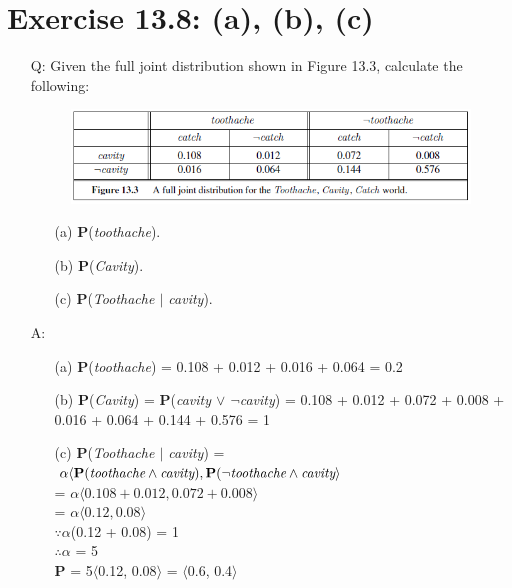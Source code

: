 \documentclass{article}
\begin{document}
\section{Exercise 13.8: (a), (b), (c)}
\begin{itemize}
\item[Q:]Given the full joint distribution shown in Figure 13.3, calculate the following:
\begin{figure}[h!]
\centering
\includegraphics[width=\textwidth]{fig13_3.png}
\end{figure}
\begin{itemize}
\item[(a)]\textbf P(\textit{toothache}).
\item[(b)]\textbf P(\textit{Cavity}).
\item[(c)]\textbf P(\textit{Toothache $\vert$ cavity}).
\end{itemize}
\item[A:]
\begin{itemize}
\item[(a)]\textbf P(\textit{toothache}) = 0.108 + 0.012 + 0.016 + 0.064 = 0.2
\item[(b)]\textbf P(\textit{Cavity}) = \textbf P(\textit{cavity $\vee$ $\neg$cavity}) = 0.108 + 0.012 + 0.072 + 0.008 + 0.016 + 0.064 + 0.144 + 0.576 = 1
\item[(c)]\textbf P(\textit{Toothache $\vert$ cavity}) = $\alpha\langle\textbf P(\textit{toothache}\wedge\textit{cavity}),\textbf P(\neg\textit{toothache}\wedge\textit{cavity}\rangle$\\= $\alpha\langle0.108 + 0.012, 0.072 + 0.008\rangle$\\ = $\alpha\langle0.12, 0.08\rangle$\\$\because\alpha$(0.12 + 0.08) = 1\\$\therefore\alpha$ = 5\\\textbf P = 5$\langle$0.12, 0.08$\rangle$ = $\langle$0.6, 0.4$\rangle$
\end{itemize}
\end{itemize}
\end{document}
